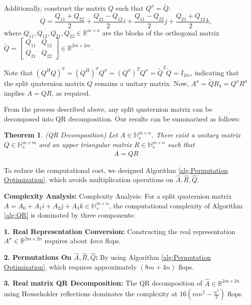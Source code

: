 \documentclass[3p]{elsarticle}
\newtheorem{theorem}{Theorem}[section]
\numberwithin{equation}{section}
\begin{document}
Additionally, construct the matrix $Q$ such that $Q^\sigma=\widetilde{Q}:$
$$
Q = \frac{Q_{11} + Q_{22}}{2} + \frac{Q_{21} - Q_{12}}{2}i + \frac{Q_{11} - Q_{22}}{2}j + \frac{Q_{21} + Q_{12}}{2}k,
$$
where  $Q_{11}, 
 Q_{12}, Q_{21}, Q_{22} \in \mathbb{R}^{m \times n}$ are the blocks of the orthogonal matrix $\widetilde{Q} = \begin{bmatrix} Q_{11} & Q_{12} \\ Q_{21} & Q_{22} \end{bmatrix} \in \mathbb{
 R}^{2m \times 2m}$.

Note that $(Q^H Q)^\sigma = {(Q^H)}^\sigma Q^\sigma = {(Q^\sigma)}^TQ^\sigma = \widetilde{Q}^T\widetilde{Q} = I_{2m}$, indicating that the split quaternion matrix $Q$ remains a unitary matrix.
Now, $A^\sigma=\widetilde{Q}R_4=Q^\sigma R^\sigma$ implies
$A = Q R$, as required.

From the process described above,  any split quaternion matrix can be decomposed into QR decomposition. Our results can be summarized as follows:
\begin{theorem}(QR Decomposition)
    Let $A \in \mathbb{H}_s^{m \times n}$. There exist a unitary matrix $Q \in \mathbb{H}_s^{m \times m}$ and an upper triangular matrix $R \in \mathbb{H}_s^{m \times n}$ such that
    \begin{eqnarray}\label{eq:split QR}
        A = Q R
    \end{eqnarray}
\end{theorem}


To reduce the computational cost, we designed Algorithm \ref{alg:Permutation Optimization}, which avoids multiplication operations on $\widehat{A}, \widehat{R}, \widehat{Q}$.

\textbf{Complexity Analysis:}
{Complexity Analysis:} For a split quaternion matrix $A = A_0 + A_1i + A_2j + A_3k \in \mathbb{H}_s^{m \times n}$, the computational complexity of Algorithm \ref{alg:QR} is dominated by three components:  

\textbf{1. Real Representation Conversion:}
Constructing the real representation $A^\sigma \in \mathbb{R}^{2m \times 2n}$ requires about $4mn$ flops. 

\textbf{2. Permutations On $\widehat{A}, \widehat{R}, \widehat{Q}$:}
By using Algorithm \ref{alg:Permutation Optimization},  which requires approximately  $(8m+4n)$ flops.


\textbf{3. Real matrix QR Decomposition:}
The QR decomposition of $\widehat{A} \in \mathbb{R}^{2m \times 2n}$ using Householder reflections dominates the complexity at $16(mn^2-\frac{n^3}{3})$ flops.
\end{document}
